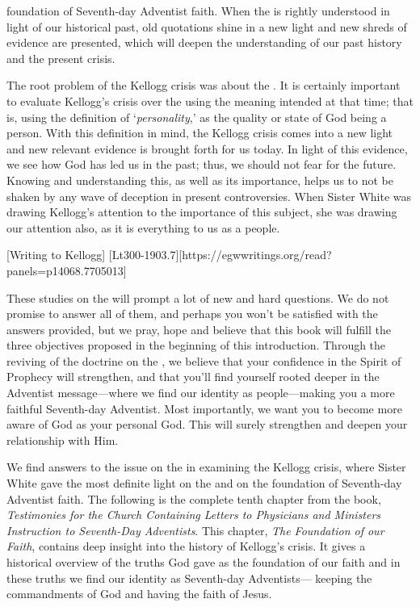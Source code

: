 foundation of Seventh-day Adventist faith. When the  is rightly understood in light of our historical past, old quotations shine in a new light and new shreds of evidence are presented, which will deepen the understanding of our past history and the present crisis.

The root problem of the Kellogg crisis was about the . It is certainly important to evaluate Kellogg's crisis over the  using the meaning intended at that time; that is, using the definition of ‘\textit{personality},’ as the quality or state of God being a person. With this definition in mind, the Kellogg crisis comes into a new light and new relevant evidence is brought forth for us today. In light of this evidence, we see how God has led us in the past; thus, we should not fear for the future. Knowing and understanding this, as well as its importance, helps us to not be shaken by any wave of deception in present controversies. When Sister White was drawing Kellogg’s attention to the importance of this subject, she was drawing our attention also, as it is everything to us as a people.

[Writing to Kellogg] [Lt300-1903.7][https://egwwritings.org/read?panels=p14068.7705013]

These studies on the  will prompt a lot of new and hard questions. We do not promise to answer all of them, and perhaps you won’t be satisfied with the answers provided, but we pray, hope and believe that this book will fulfill the three objectives proposed in the beginning of this introduction. Through the reviving of the doctrine on the , we believe that your confidence in the Spirit of Prophecy will strengthen, and that you’ll find yourself rooted deeper in the Adventist message—where we find our identity as people—making you a more faithful Seventh-day Adventist. Most importantly, we want you to become more aware of God as your personal God. This will surely strengthen and deepen your relationship with Him. 

We find answers to the issue on the  in examining the Kellogg crisis, where Sister White gave the most definite light on the  and on the foundation of Seventh-day Adventist faith. The following is the complete tenth chapter from the book, \textit{Testimonies for the Church Containing Letters to Physicians and Ministers Instruction to Seventh-Day Adventists}. This chapter, \textit{The Foundation of our Faith}, contains deep insight into the history of Kellogg’s crisis. It gives a historical overview of the truths God gave as the foundation of our faith and in these truths we find our identity as Seventh-day Adventists— keeping the commandments of God and having the faith of Jesus.
